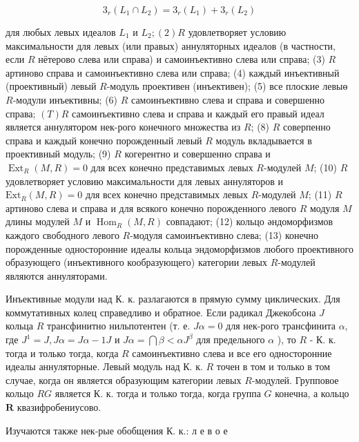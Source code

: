 \documentclass[10pt]{article}
\begin{document}
\[

3_{r}\left(L_{1} \cap L_{2}\right)=3_{r}\left(L_{1}\right)+3_{r}\left(L_{2}\right)

\]



для любых левых идеалов $L_{1}$ и $L_{2} ;(2) R$ удовлетворяет условию максимальности для левых (или правых) аннуляторных идеалов (в частности, если $R$ нётерово слева или справа) и самоинъективно слева или справа; (3) $R$ артиново справа и самоинъективно слева или справа; (4) каждый инъективный (проективный) левый $R$-модуль проективен (инъективен); (5) все плоские левыө $R$-модули инъективны; (6) $R$ самоинъективно слева и справа и совершенно справа; $(T) R$ самоинъективно слева и справа и каждый его правый идеал является аннулятором нек-рого конечного множества из $R$; (8) $R$ соверпенно справа и каждый конечно порожденный левый $R$ модуль вкладывается в проективный модуль; (9) $R$ когерентно и совершенно справа и $\operatorname{Ext}_{R}(M, R)=0$ для всех конечно представимых левых $R$-модулей $M$; (10) $R$ удовлетворяет условию максимальности для левых аннуляторов и $\mathrm{Ext}_{R}(M, R)=0$ для всех конечно представимых левых $R$-модулей $M$; (11) $R$ артиново слева и справа и для всякого конечно порожденного левого $R$ модуля $M$ длины модулей $M$ и $\operatorname{Hom}_{R}(M, R)$ совпадают; (12) кольцо әндоморфизмов каждого свободного левого $R$-модуля самоинъективно слева; (13) конечно порожденные односторонние идеалы кольца эндоморфизмов любого проективного образующего (инъективного кообразующего) категории левых $R$-модулей являются аннуляторами.



Инъективные модули над К. к. разлагаются в прямую сумму циклических. Для коммутативных колец справедливо и обратное. Если радикал Джекобсона $J$ кольца $R$ трансфинитно нильпотентен (т. е. $J \alpha=0$ для нек-рого трансфинита $\alpha$, где $J^{1}=J, J \alpha=J \alpha-1 J$ и $J \alpha=\bigcap \beta<\alpha J^{\beta}$ для предельного $\alpha$ ), то $R$ - К. к. тогда и только тогда, когда $R$ самоинъективно слева и все его односторонние идеалы аннуляторные. Левый модуль над К. к. $R$ точен в том и только в том случае, когда он является образующим категории левых $R$-модулей. Групповое кольцо $R G$ является К. к. тогда и только тогда, когда группа $G$ конечна, а кольцо $\boldsymbol{R}$ квазифробениусово.



Изучаются также нек-рые обобщения К. к.: л е в о е
\end{document}
